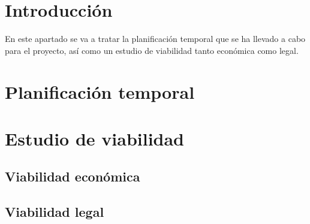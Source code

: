 
\section{Introducción}

En este apartado se va a tratar la planificación temporal que se ha llevado a cabo para el proyecto, así como un estudio de viabilidad tanto económica como legal.

\section{Planificación temporal}



\section{Estudio de viabilidad}

\subsection{Viabilidad económica}

\subsection{Viabilidad legal}


